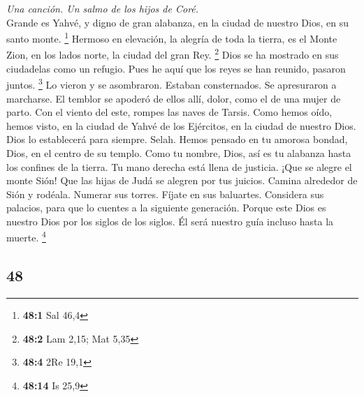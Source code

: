 \begin{paracol}{2}
\emph{Una canción. Un salmo de los hijos de Coré.}\\
 Grande es Yahvé, y digno de gran alabanza, en la ciudad
de nuestro Dios, en su santo monte. \footnote{\textbf{48:1} Sal 46,4}
 Hermoso en elevación, la alegría de toda la tierra, es el
Monte Zion, en los lados norte, la ciudad del gran Rey. \footnote{\textbf{48:2}
  Lam 2,15; Mat 5,35}  Dios se ha mostrado en sus
ciudadelas como un refugio.  Pues he aquí que los reyes se
han reunido, pasaron juntos. \footnote{\textbf{48:4} 2Re 19,1}
 Lo vieron y se asombraron. Estaban consternados. Se
apresuraron a marcharse.  El temblor se apoderó de ellos
allí, dolor, como el de una mujer de parto.  Con el viento
del este, rompes las naves de Tarsis.  Como hemos oído,
hemos visto, en la ciudad de Yahvé de los Ejércitos, en la ciudad de
nuestro Dios. Dios lo establecerá para siempre. Selah. 
Hemos pensado en tu amorosa bondad, Dios, en el centro de su templo.
 Como tu nombre, Dios, así es tu alabanza hasta los
confines de la tierra. Tu mano derecha está llena de justicia.
 ¡Que se alegre el monte Sión! Que las hijas de Judá se
alegren por tus juicios.  Camina alrededor de Sión y
rodéala. Numerar sus torres.  Fíjate en sus baluartes.
Considera sus palacios, para que lo cuentes a la siguiente generación.
 Porque este Dios es nuestro Dios por los siglos de los
siglos. Él será nuestro guía incluso hasta la muerte. \footnote{\textbf{48:14}
  Is 25,9}

\switchcolumn
\begin{otherlanguage}{english}

\hypertarget{section-95}{%
\section{48}\label{section-95}}


\end{otherlanguage}
\end{paracol}
